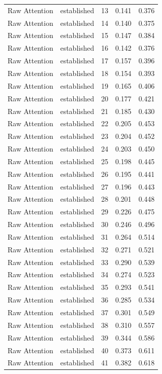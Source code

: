 \begin{tabular}{llrrr}
Raw Attention & established & 13 & 0.141 & 0.376 \\
Raw Attention & established & 14 & 0.140 & 0.375 \\
Raw Attention & established & 15 & 0.147 & 0.384 \\
Raw Attention & established & 16 & 0.142 & 0.376 \\
Raw Attention & established & 17 & 0.157 & 0.396 \\
Raw Attention & established & 18 & 0.154 & 0.393 \\
Raw Attention & established & 19 & 0.165 & 0.406 \\
Raw Attention & established & 20 & 0.177 & 0.421 \\
Raw Attention & established & 21 & 0.185 & 0.430 \\
Raw Attention & established & 22 & 0.205 & 0.453 \\
Raw Attention & established & 23 & 0.204 & 0.452 \\
Raw Attention & established & 24 & 0.203 & 0.450 \\
Raw Attention & established & 25 & 0.198 & 0.445 \\
Raw Attention & established & 26 & 0.195 & 0.441 \\
Raw Attention & established & 27 & 0.196 & 0.443 \\
Raw Attention & established & 28 & 0.201 & 0.448 \\
Raw Attention & established & 29 & 0.226 & 0.475 \\
Raw Attention & established & 30 & 0.246 & 0.496 \\
Raw Attention & established & 31 & 0.264 & 0.514 \\
Raw Attention & established & 32 & 0.271 & 0.521 \\
Raw Attention & established & 33 & 0.290 & 0.539 \\
Raw Attention & established & 34 & 0.274 & 0.523 \\
Raw Attention & established & 35 & 0.293 & 0.541 \\
Raw Attention & established & 36 & 0.285 & 0.534 \\
Raw Attention & established & 37 & 0.301 & 0.549 \\
Raw Attention & established & 38 & 0.310 & 0.557 \\
Raw Attention & established & 39 & 0.344 & 0.586 \\
Raw Attention & established & 40 & 0.373 & 0.611 \\
Raw Attention & established & 41 & 0.382 & 0.618 \\

\end{tabular}
